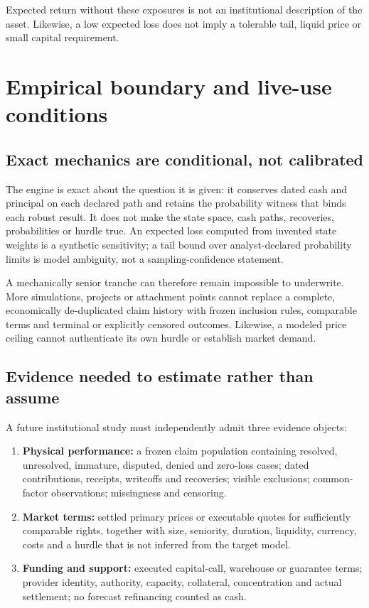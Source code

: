 \documentclass[11pt,a4paper]{article}
\begin{document}
Expected return without these exposures is not an institutional description of the asset. Likewise, a low expected loss does not imply a tolerable tail, liquid price or small capital requirement.

\section{Empirical boundary and live-use conditions}

\subsection{Exact mechanics are conditional, not calibrated}

The engine is exact about the question it is given: it conserves dated cash and principal on each declared path and retains the probability witness that binds each robust result. It does not make the state space, cash paths, recoveries, probabilities or hurdle true. An expected loss computed from invented state weights is a synthetic sensitivity; a tail bound over analyst-declared probability limits is model ambiguity, not a sampling-confidence statement.

A mechanically senior tranche can therefore remain impossible to underwrite. More simulations, projects or attachment points cannot replace a complete, economically de-duplicated claim history with frozen inclusion rules, comparable terms and terminal or explicitly censored outcomes. Likewise, a modeled price ceiling cannot authenticate its own hurdle or establish market demand.

\subsection{Evidence needed to estimate rather than assume}

A future institutional study must independently admit three evidence objects:

\begin{enumerate}
  \item \textbf{Physical performance:} a frozen claim population containing resolved, unresolved, immature, disputed, denied and zero-loss cases; dated contributions, receipts, writeoffs and recoveries; visible exclusions; common-factor observations; missingness and censoring.
  \item \textbf{Market terms:} settled primary prices or executable quotes for sufficiently comparable rights, together with size, seniority, duration, liquidity, currency, costs and a hurdle that is not inferred from the target model.
  \item \textbf{Funding and support:} executed capital-call, warehouse or guarantee terms; provider identity, authority, capacity, collateral, concentration and actual settlement; no forecast refinancing counted as cash.
\end{enumerate}
\end{document}
